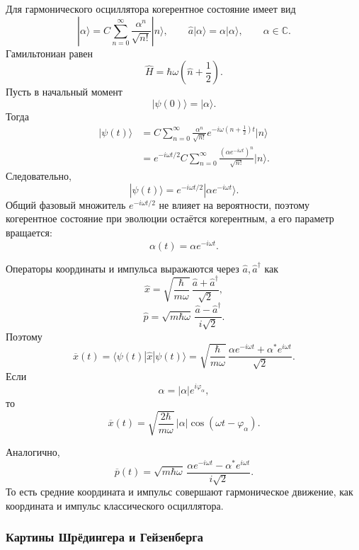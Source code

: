 \documentclass[12pt,a4paper]{article}
\begin{document}
Для гармонического осциллятора когерентное состояние имеет вид
\[
    |\alpha\rangle
    =
    C
    \sum_{n=0}^{\infty}
        \frac{\alpha^n}{\sqrt{n!}}|n\rangle,
    \qquad
    \hat a|\alpha\rangle
    =
    \alpha|\alpha\rangle,
    \qquad
    \alpha\in\mathbb C.
\]
Гамильтониан равен
\[
    \hat H
    =
    \hbar\omega
    \left(
        \hat n+\frac12
    \right).
\]
Пусть в начальный момент
\[
    |\psi(0)\rangle=|\alpha\rangle.
\]
Тогда
\begin{align*}
    |\psi(t)\rangle
    &=
    C\sum_{n=0}^{\infty}
        \frac{\alpha^n}{\sqrt{n!}}
        e^{-i\omega(n+\frac12)t}
        |n\rangle
    \\
    &=
    e^{-i\omega t/2}
    C\sum_{n=0}^{\infty}
        \frac{
            \left(
                \alpha e^{-i\omega t}
            \right)^n
        }{\sqrt{n!}}
        |n\rangle.
\end{align*}
Следовательно,
\[
    \boxed{
        |\psi(t)\rangle
        =
        e^{-i\omega t/2}
        |\alpha e^{-i\omega t}\rangle
    }.
\]
Общий фазовый множитель $e^{-i\omega t/2}$ не влияет на вероятности,
поэтому когерентное состояние при эволюции остаётся когерентным, а его
параметр вращается:
\[
    \alpha(t)=\alpha e^{-i\omega t}.
\]

Операторы координаты и импульса выражаются через
$\hat a,\hat a^\dagger$ как
\[
    \hat x
    =
    \sqrt{\frac{\hbar}{m\omega}}\,
    \frac{\hat a+\hat a^\dagger}{\sqrt2},
\]
\[
    \hat p
    =
    \sqrt{m\hbar\omega}\,
    \frac{\hat a-\hat a^\dagger}{i\sqrt2}.
\]
Поэтому
\[
    \boxed{
    \overline{x}(t)
    =
    \langle\psi(t)|\hat x|\psi(t)\rangle
    =
    \sqrt{\frac{\hbar}{m\omega}}\,
    \frac{
        \alpha e^{-i\omega t}
        +
        \alpha^*e^{i\omega t}
    }{\sqrt2}
    }.
\]
Если
\[
    \alpha=|\alpha|e^{i\varphi_\alpha},
\]
то
\[
    \overline{x}(t)
    =
    \sqrt{\frac{2\hbar}{m\omega}}\,
    |\alpha|
    \cos(\omega t-\varphi_\alpha).
\]

Аналогично,
\[
    \boxed{
    \overline{p}(t)
    =
    \sqrt{m\hbar\omega}\,
    \frac{
        \alpha e^{-i\omega t}
        -
        \alpha^*e^{i\omega t}
    }{i\sqrt2}
    }.
\]
То есть средние координата и импульс совершают гармоническое движение,
как координата и импульс классического осциллятора.


\subsubsection{Картины Шрёдингера и Гейзенберга}
\end{document}
